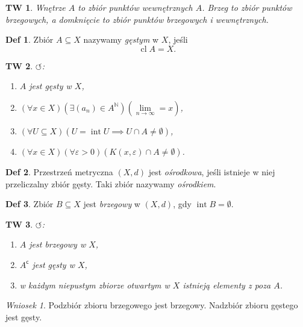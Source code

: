 \documentclass[a4paper, 12pt]{mwart}
\newcommand{\cc}{\mathsf{c}}
\DeclareMathOperator{\cl}{cl}
\DeclareMathOperator{\intr}{int}
\theoremstyle{definition}
\newtheorem{definicja}{Def}[section]
\theoremstyle{plain}
\newtheorem{twierdzenie}{TW}[section]
\theoremstyle{remark}
\newtheorem{wniosek}{Wniosek}[section]
\begin{document}
\begin{twierdzenie}
	Wnętrze $A$ to zbiór punktów wewnętrznych $A$. Brzeg to zbiór punktów brzegowych, a domknięcie to zbiór punktów brzegowych i wewnętrznych.
\end{twierdzenie}
\begin{definicja}
	Zbiór $A \subseteq X$ nazywamy \emph{gęstym} w $X$, jeśli
	\begin{equation}
		\cl A = X.
	\end{equation}
\end{definicja}
\begin{twierdzenie}
	$\circlearrowleft$:
	\begin{enumerate}
		\item $A$ jest gęsty w $X$,
		\item $\left(\forall x \in X\right)\left(\exists (a_n) \in A^\mathbb{N}\right)\left(\lim\limits_{n \to \infty} = x\right)$,
		\item $\left(\forall U \subseteq X\right)\left(U = \intr U \implies U \cap A \neq \emptyset\right)$,
		\item $\left(\forall x \in X\right)\left(\forall \varepsilon > 0\right)\left(K(x, \varepsilon) \cap A \neq \emptyset\right)$.
	\end{enumerate}
\end{twierdzenie}
\begin{definicja}
	Przestrzeń metryczna $(X, d)$ jest \emph{ośrodkowa}, jeśli istnieje w niej przeliczalny zbiór gęsty. Taki zbiór nazywamy \emph{ośrodkiem}. %
\end{definicja}
\begin{definicja}
	Zbiór $B \subseteq X$ jest \emph{brzegowy} w $(X, d)$, gdy $\intr B = \emptyset$.
\end{definicja}
\begin{twierdzenie}
	$\circlearrowleft$:
	\begin{enumerate}
		\item $A$ jest brzegowy w $X$,
		\item $A^\cc$ jest gęsty w $X$,
		\item w każdym niepustym zbiorze otwartym w $X$ istnieją elementy z poza $A$.
	\end{enumerate}
\end{twierdzenie}
\begin{wniosek}
	Podzbiór zbioru brzegowego jest brzegowy. Nadzbiór zbioru gęstego jest gęsty.
\end{wniosek}
\end{document}
